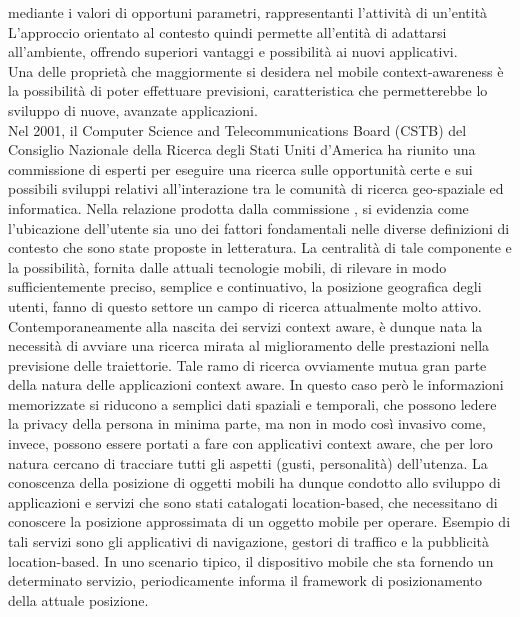 mediante i valori di opportuni parametri, rappresentanti l'attivit\`a di un'entit\`a
L'approccio orientato al contesto quindi permette all'entit\`a di adattarsi all'ambiente,
offrendo superiori vantaggi e possibilit\`a ai nuovi applicativi.\\
Una delle propriet\`a che maggiormente si desidera nel mobile context-awareness
\`e la possibilit\`a di poter effettuare previsioni, caratteristica che permetterebbe
lo sviluppo di nuove, avanzate applicazioni.\\
Nel 2001, il Computer Science and Telecommunications Board (CSTB) del
Consiglio Nazionale della Ricerca degli Stati Uniti d'America ha riunito una
commissione di esperti per eseguire una ricerca sulle opportunit\`a certe e sui
possibili sviluppi relativi all'interazione tra le comunit\`a di ricerca geo-spaziale
ed informatica. Nella relazione prodotta dalla commissione \cite{cit_47}, si evidenzia
come l'ubicazione dell'utente sia uno dei fattori fondamentali nelle diverse
definizioni di contesto che sono state proposte in letteratura. La centralit\`a
di tale componente e la possibilit\`a, fornita dalle attuali tecnologie mobili, di
rilevare in modo sufficientemente preciso, semplice e continuativo, la posizione
geografica degli utenti, fanno di questo settore un campo di ricerca attualmente
molto attivo.\\
Contemporaneamente alla nascita dei servizi context aware, \`e dunque nata
la necessit\`a di avviare una ricerca mirata al miglioramento delle prestazioni
nella previsione delle traiettorie. Tale ramo di ricerca ovviamente mutua gran
parte della natura delle applicazioni context aware. In questo caso per\`o le
informazioni memorizzate si riducono a semplici dati spaziali e temporali, che
possono ledere la privacy della persona in minima parte, ma non in modo cos\`i
invasivo come, invece, possono essere portati a fare con applicativi context aware,
che per loro natura cercano di tracciare tutti gli aspetti (gusti, personalit\`a)
dell'utenza. La conoscenza della posizione di oggetti mobili ha dunque condotto
allo sviluppo di applicazioni e servizi che sono stati catalogati location-based,
che necessitano di conoscere la posizione approssimata di un oggetto mobile per
operare. Esempio di tali servizi sono gli applicativi di navigazione, gestori
di traffico e la pubblicit\`a location-based. In uno scenario tipico, il
dispositivo mobile che sta fornendo un determinato servizio, periodicamente
informa il framework di posizionamento della attuale posizione.\\
